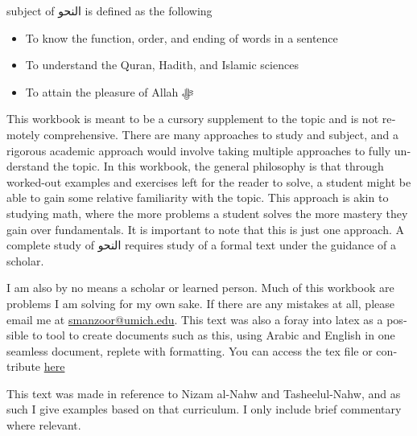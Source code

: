 \documentclass[../main.tex]{subfiles}
\begin{document}
\begin{english}
     subject of \textarabic{النحو} is defined as the following
    \begin{itemize}
        \item To know the function, order, and ending of words in a sentence
        \item To understand the Quran, Hadith, and Islamic sciences
        \item To attain the pleasure of Allah ﷻ
    \end{itemize}
    This workbook is meant to be a cursory supplement to the topic and is not remotely comprehensive. There are many approaches to study and subject, and a rigorous academic approach would involve taking multiple approaches to fully understand the topic. In this workbook, the general philosophy is that through worked-out examples and exercises left for the reader to solve, a student might be able to gain some relative familiarity with the topic. This approach is akin to studying math, where the more problems a student solves the more mastery they gain over fundamentals. It is important to note that this is just one approach. A complete study of \textarabic{النحو} requires study of a formal text under the guidance of a scholar.

    I am also by no means a scholar or learned person. Much of this workbook are problems I am solving for my own sake. If there are any mistakes at all, please email me at \href{mailto:smanzoor@umich.edu}{smanzoor@umich.edu}. This text was also a foray into latex as a possible to tool to create documents such as this, using Arabic and English in one seamless document, replete with formatting. You can access the tex file or contribute \href{https://github.com/Yoyomanzoor/alnahw-bilmiran}{here}

    This text was made in reference to Nizam al-Nahw\supercite{nizam} and Tasheelul-Nahw\supercite{tasheel}, and as such I give examples based on that curriculum. I only include brief commentary where relevant.
\end{english}

\pagebreak
\end{document}
